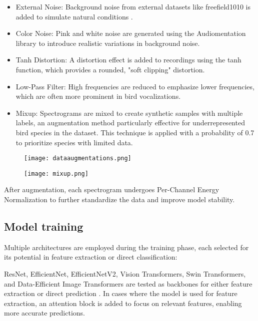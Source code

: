 \begin{itemize}
    \item External Noise: Background noise from external datasets like freefield1010 is added to simulate natural conditions \cite{stowell2013open}.
    \item Color Noise: Pink and white noise are generated using the Audiomentation library to introduce realistic variations in background noise.
    \item Tanh Distortion: A distortion effect is added to recordings using the tanh function, which provides a rounded, "soft clipping" distortion.
    \item Low-Pass Filter: High frequencies are reduced to emphasize lower frequencies, which are often more prominent in bird vocalizations.
    \item Mixup: Spectrograms are mixed to create synthetic samples with multiple labels, an augmentation method particularly effective for underrepresented bird species in the dataset. This technique is applied with a probability of 0.7 to prioritize species with limited data\cite{zhang2017mixup}.
\end{itemize}

\begin{figure}[h!]
    \centering
    \begin{minipage}{.5\textwidth}
        \centering
        \texttt{[image: dataaugmentations.png]}
        \label{fig:augmentation}
    \end{minipage}%
    \begin{minipage}{.5\textwidth}
        \centering
        \texttt{[image: mixup.png]}
        \label{fig:augmentation}
    \end{minipage}
    \caption{}
    \label{fig:augmentation}
\end{figure}

After augmentation, each spectrogram undergoes Per-Channel Energy Normalization to further standardize the data and improve model stability.

\subsection{Model training}
Multiple architectures are employed during the training phase, each selected for its potential in feature extraction or direct classification:

ResNet, EfficientNet, EfficientNetV2, Vision Transformers, Swin Transformers, and Data-Efficient Image Transformers are tested as backbones for either feature extraction or direct prediction \cite{he2016deep,tan2019efficientnet,tan2021efficientnetv2, dosovitskiy2020image, liu2021swin, touvron2021training}. In cases where the model is used for feature extraction, an attention block is added to focus on relevant features, enabling more accurate predictions.

